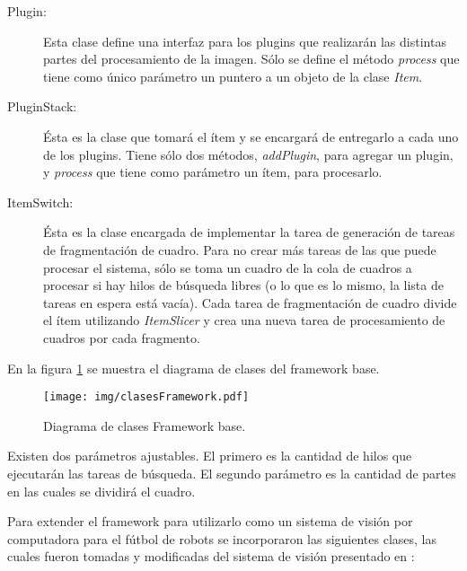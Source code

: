 \begin{description}
	\item[Plugin:] Esta clase define una interfaz para los plugins que
		realizarán las distintas partes del procesamiento de la imagen.
		Sólo se define el método \emph{process} que tiene como único
		parámetro un puntero a un objeto de la clase \emph{Item}.

	\item[PluginStack:] Ésta es la clase que tomará el ítem y se encargará
		de entregarlo a cada uno de los plugins. Tiene sólo dos métodos,
		\emph{addPlugin}, para agregar un plugin, y \emph{process} que
		tiene como parámetro un ítem, para procesarlo.

	\item[ItemSwitch:] Ésta es la clase encargada de implementar la tarea de
		generación de tareas de fragmentación de cuadro. Para no crear
		más tareas de las que puede procesar el sistema, sólo se toma un
		cuadro de la cola de cuadros a procesar si hay hilos de búsqueda
		libres (o lo que es lo mismo, la lista de tareas en espera está
		vacía). Cada tarea de fragmentación de cuadro divide el ítem
		utilizando \emph{ItemSlicer} y crea una nueva tarea de
		procesamiento de cuadros por cada fragmento.

\end{description}

En la figura \ref{clasesFramework} se muestra el diagrama de clases del
framework base.

\begin{figure}[!htb]

	\texttt{[image: img/clasesFramework.pdf]}

	\caption{Diagrama de clases Framework base.}

	\label{clasesFramework}

\end{figure}

Existen dos parámetros ajustables. El primero es la cantidad de hilos que
ejecutarán las tareas de búsqueda. El segundo parámetro es la cantidad de partes
en las cuales se dividirá el cuadro.

Para extender el framework para utilizarlo como un sistema de visión por
computadora para el fútbol de robots se incorporaron las siguientes clases, las
cuales fueron tomadas y modificadas del sistema de visión presentado en
\cite{torres2014}:

